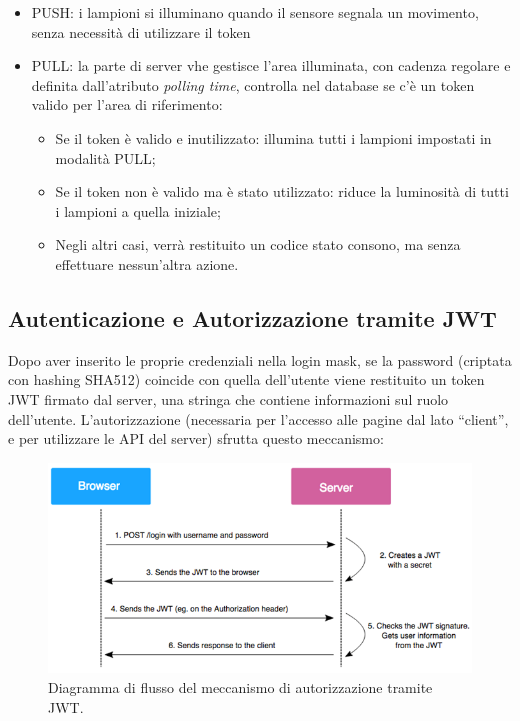 \documentclass[a4paper, 11pt]{article}
\begin{document}
\begin{itemize}
    \item PUSH: i lampioni si illuminano quando il sensore segnala un movimento, senza necessità di utilizzare il token
    \item PULL: la parte di server vhe gestisce l'area illuminata, con cadenza regolare e definita dall'atributo \textit{polling time}, controlla nel database se c'è un token valido per l'area di riferimento:
    \begin{itemize}
        \item Se il token è valido e inutilizzato: illumina tutti i lampioni impostati in modalità PULL;
        \item Se il token non è valido ma è stato utilizzato: riduce la luminosità di tutti i lampioni a quella iniziale;
        \item Negli altri casi, verrà restituito un codice stato consono, ma senza effettuare nessun'altra azione.
    \end{itemize}
\end{itemize}

\subsection{Autenticazione e Autorizzazione tramite JWT}
Dopo aver inserito le proprie credenziali nella login mask, se la password (criptata con hashing SHA512) coincide con quella dell'utente viene restituito un token JWT firmato dal server, una stringa che contiene informazioni sul ruolo dell'utente. L'autorizzazione (necessaria per l'accesso alle pagine dal lato “client”, e per utilizzare le API del server) sfrutta questo meccanismo:
\begin{figure}[H]
    \centering
    \includegraphics[width=\textwidth]{auth}
    \caption{Diagramma di flusso del meccanismo di autorizzazione tramite JWT.}
\end{figure}
\end{document}
